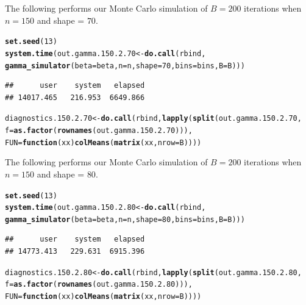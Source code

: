 \documentclass[11pt]{article}\usepackage[]{graphicx}\usepackage[]{color}
\makeatletter
\newcommand{\hlnum}[1]{\textcolor[rgb]{0.686,0.059,0.569}{#1}}%
\newcommand{\hlstd}[1]{\textcolor[rgb]{0.345,0.345,0.345}{#1}}%
\newcommand{\hlkwa}[1]{\textcolor[rgb]{0.161,0.373,0.58}{\textbf{#1}}}%
\newcommand{\hlkwb}[1]{\textcolor[rgb]{0.69,0.353,0.396}{#1}}%
\newcommand{\hlkwc}[1]{\textcolor[rgb]{0.333,0.667,0.333}{#1}}%
\newcommand{\hlkwd}[1]{\textcolor[rgb]{0.737,0.353,0.396}{\textbf{#1}}}%
\newenvironment{kframe}{%
 \def\at@end@of@kframe{}%
 \ifinner\ifhmode%
  \def\at@end@of@kframe{\end{minipage}}%
  \begin{minipage}{\columnwidth}%
 \fi\fi%
 \def\FrameCommand##1{\hskip\@totalleftmargin \hskip-\fboxsep
 \colorbox{shadecolor}{##1}\hskip-\fboxsep
     \hskip-\linewidth \hskip-\@totalleftmargin \hskip\columnwidth}%
 \MakeFramed {\advance\hsize-\width
   \@totalleftmargin\z@ \linewidth\hsize
   \@setminipage}}%
 {\par\unskip\endMakeFramed%
 \at@end@of@kframe}
\newenvironment{knitrout}{}{} %
\makeatother
\begin{document}
The following performs our Monte Carlo simulation of $B = 200$ iterations 
when $n = 150$ and shape = $70$.

\begin{knitrout}
\color{fgcolor}\begin{kframe}
\begin{alltt}
\hlkwd{set.seed}\hlstd{(}\hlnum{13}\hlstd{)}
\hlkwd{system.time}\hlstd{(out.gamma.150.2.70} \hlkwb{<-} \hlkwd{do.call}\hlstd{(rbind,}
  \hlkwd{gamma_simulator}\hlstd{(}\hlkwc{beta} \hlstd{= beta,} \hlkwc{n} \hlstd{= n,} \hlkwc{shape} \hlstd{=} \hlnum{70}\hlstd{,} \hlkwc{bins} \hlstd{= bins,} \hlkwc{B} \hlstd{= B)))}
\end{alltt}
\begin{verbatim}
##      user    system   elapsed 
## 14017.465   216.953  6649.866
\end{verbatim}
\begin{alltt}
\hlstd{diagnostics.150.2.70} \hlkwb{<-} \hlkwd{do.call}\hlstd{(rbind,} \hlkwd{lapply}\hlstd{(}\hlkwd{split}\hlstd{(out.gamma.150.2.70,}
  \hlkwc{f} \hlstd{=} \hlkwd{as.factor}\hlstd{(}\hlkwd{rownames}\hlstd{(out.gamma.150.2.70))),}
  \hlkwc{FUN} \hlstd{=} \hlkwa{function}\hlstd{(}\hlkwc{xx}\hlstd{)} \hlkwd{colMeans}\hlstd{(}\hlkwd{matrix}\hlstd{(xx,} \hlkwc{nrow} \hlstd{= B))))}
\end{alltt}
\end{kframe}
\end{knitrout}




The following performs our Monte Carlo simulation of $B = 200$ iterations 
when $n = 150$ and shape = $80$.

\begin{knitrout}
\color{fgcolor}\begin{kframe}
\begin{alltt}
\hlkwd{set.seed}\hlstd{(}\hlnum{13}\hlstd{)}
\hlkwd{system.time}\hlstd{(out.gamma.150.2.80} \hlkwb{<-} \hlkwd{do.call}\hlstd{(rbind,}
  \hlkwd{gamma_simulator}\hlstd{(}\hlkwc{beta} \hlstd{= beta,} \hlkwc{n} \hlstd{= n,} \hlkwc{shape} \hlstd{=} \hlnum{80}\hlstd{,} \hlkwc{bins} \hlstd{= bins,} \hlkwc{B} \hlstd{= B)))}
\end{alltt}
\begin{verbatim}
##      user    system   elapsed 
## 14773.413   229.631  6915.396
\end{verbatim}
\begin{alltt}
\hlstd{diagnostics.150.2.80} \hlkwb{<-} \hlkwd{do.call}\hlstd{(rbind,} \hlkwd{lapply}\hlstd{(}\hlkwd{split}\hlstd{(out.gamma.150.2.80,}
  \hlkwc{f} \hlstd{=} \hlkwd{as.factor}\hlstd{(}\hlkwd{rownames}\hlstd{(out.gamma.150.2.80))),}
  \hlkwc{FUN} \hlstd{=} \hlkwa{function}\hlstd{(}\hlkwc{xx}\hlstd{)} \hlkwd{colMeans}\hlstd{(}\hlkwd{matrix}\hlstd{(xx,} \hlkwc{nrow} \hlstd{= B))))}
\end{alltt}
\end{kframe}
\end{knitrout}
\end{document}
